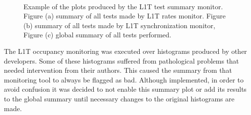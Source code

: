 \begin{figure}[!htp]%
\centering
{}\qquad
{}\\
\caption[Example of the plots produced by the \gls{L1T} test summary monitor]{Example of the plots produced by the \gls{L1T} test summary monitor. Figure (a) summary of all tests made by \gls{L1T} rates monitor. Figure (b) summary of all tests made by \gls{L1T} synchronization monitor, Figure (c) global summary of all tests performed.}
\label{FIGURE:TechnicalWork_TestsSummary}
\end{figure}

The \gls{L1T} occupancy monitoring was executed over histograms produced by other developers. Some of these histograms suffered from pathological problems that needed intervention from their authors. This caused the summary from that monitoring tool to always be flagged as bad. Although implemented, in order to avoid confusion it was decided to not enable this summary plot or add its results to the global summary until necessary changes to the original histograms are made.

